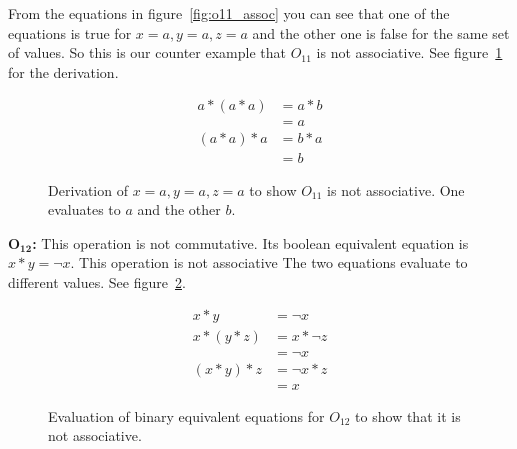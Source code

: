 \documentclass{amsart}
\begin{document}
\begin{enumerate}
   From the equations in figure~\ref{fig:o11_assoc} you can see that
   one of the equations is true for ${x = a, y = a, z = a}$ and the other
   one is false for the same set of values. So this is our counter example
   that $O_{11}$ is not associative. See figure~\ref{fig:o11_assoc2}
   for the derivation.

   \begin{figure}
      \caption{Derivation of ${x = a, y = a, z = a}$ to show $O_{11}$ 
      is not associative. One evaluates to $a$ and the other $b$.}
      \label{fig:o11_assoc2} 
      \begin{align*}
         a * (a * a) & = a * b \\
                     & = a \\
         (a * a) * a & = b * a \\
	             & = b        
      \end{align*}
   \end{figure}

   $\mathbf{O_{12}}$\textbf{:} This operation is not commutative. Its boolean
   equivalent equation is $x * y = \neg x$. This operation is not associative
   The two equations evaluate to different values. See figure~\ref{fig:o12_assoc}.

   \begin{figure}
      \caption{Evaluation of binary equivalent equations for $O_{12}$ to show
      that it is not associative.}
      \label{fig:o12_assoc}
      \begin{align*}
         x * y & = \neg x  \\
         x * (y * z) & = x * \neg z \\
	             & = \neg x \\
         (x * y) * z & = \neg x * z \\
	             & = x
      \end{align*}
   \end{figure}

\end{enumerate}
\end{document}
